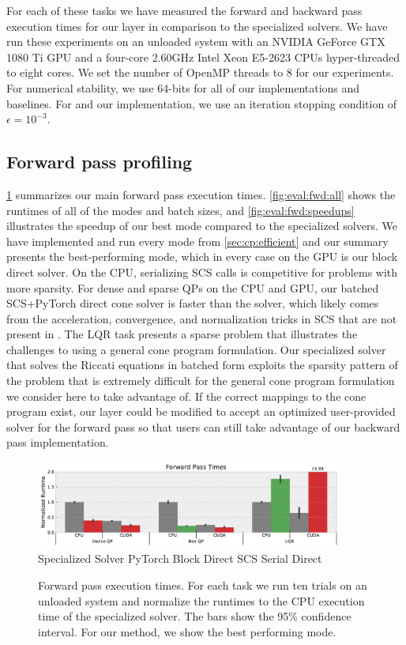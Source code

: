 For each of these tasks we have measured the forward
and backward pass execution times for our layer in
comparison to the specialized solvers.
We have run these experiments on an unloaded system with
an NVIDIA GeForce GTX 1080 Ti GPU and
a four-core 2.60GHz Intel Xeon E5-2623 CPUs hyper-threaded
to eight cores.
We set the number of OpenMP threads to 8 for our experiments.
For numerical stability, we use 64-bits for all of
our implementations and baselines.
For \qpth and our implementation, we use an iteration
stopping condition of $\epsilon=10^{-3}$.

\newpage
\subsection{Forward pass profiling}
\cref{fig:eval:fwd} summarizes our main forward pass execution
times. \cref{fig:eval:fwd:all} shows the runtimes of all of the
modes and batch sizes, and \cref{fig:eval:fwd:speedups}
illustrates the speedup of our best mode compared to the
specialized solvers.
We have implemented and run every mode from \cref{sec:cp:efficient}
and our summary presents the best-performing mode,
which in every case on the GPU is our block direct solver.
On the CPU, serializing SCS calls is competitive for
problems with more sparsity.
For dense and sparse QPs on the CPU and GPU, our batched
SCS+PyTorch direct cone solver is faster than
the \qpth solver, which likely comes from the
acceleration, convergence, and normalization
tricks in SCS that are not present in \qpth.
The LQR task presents a sparse problem that illustrates
the challenges to using a general cone program formulation.
Our specialized solver that solves the Riccati equations in
batched form exploits the sparsity pattern of the problem
that is extremely difficult for the general cone program
formulation we consider here to take advantage of.
If the correct mappings to the cone program exist,
our layer could be modified to accept an
optimized user-provided solver for the forward pass
so that users can still take advantage of our backward
pass implementation.

\begin{figure}[t]
  \centering
  \includegraphics[width=0.9\textwidth]{prof/forward-summary.pdf} \\
   Specialized Solver \enskip
   PyTorch Block Direct \enskip
   SCS Serial Direct
  \caption{
    Forward pass execution times.
    For each task we run ten trials
    on an unloaded system and normalize the runtimes to the
    CPU execution time of the specialized solver.
    The bars show the 95\% confidence interval.
    For our method, we show the best performing mode.
  }
  \label{fig:eval:fwd}
\end{figure}

